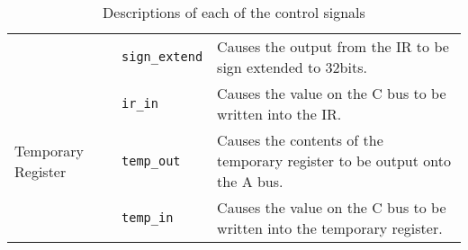 \documentclass[a4paper,10pt]{article}
\begin{document}
\begin{table}[h]
\begin{center}
\begin{tabular}{|l|l|p{8cm}|}
\cline{2-3}
& \texttt{sign\_extend} & Causes the output from the IR to be sign
extended to 32bits. \\
\cline{2-3}
& \texttt{ir\_in} & Causes the value on the C bus to be written into
the IR. \\
\hline
Temporary Register & \texttt{temp\_out} & Causes the contents of the
temporary register to be output onto the A bus. \\
\cline{2-3}
& \texttt{temp\_in} & Causes the value on the C bus to be written into
the temporary register. \\
\hline
\end{tabular}
\end{center}
\caption{Descriptions of each of the control signals}
\label{table:signals}
\end{table}
\end{document}
